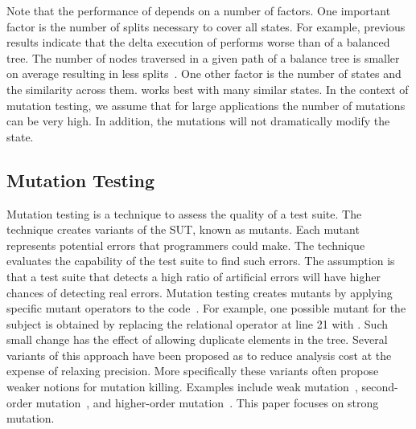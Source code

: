 \documentclass{sig-alternate}
\begin{document}
Note that the performance of \DE{} depends on a number of factors.
One important factor is the number of splits necessary to cover all
states.  For example, previous results indicate that the delta
execution of  performs worse than of a balanced tree.  The
number of nodes traversed in a given path of a balance tree is smaller
on average resulting in less
splits~\cite{damorim:issta2007,dAmorimLM08}.  One other factor is the
number of states and the similarity across them.  \DE{} works best
with many similar states.  In the context of mutation testing, we
assume that for large applications the number of mutations can be very
high.  In addition, the mutations will not dramatically modify the
state.



\subsection{Mutation Testing}
\label{sec:mut}

Mutation testing is a technique to assess the quality of a test suite.
The technique creates variants of the SUT, known as mutants.  Each
mutant represents potential errors that programmers could make.  The
technique evaluates the capability of the test suite to find such
errors.  The assumption is that a test suite that detects a high ratio
of artificial errors will have higher chances of detecting real
errors.  Mutation testing creates mutants by applying specific mutant
operators to the
code~\cite{offut-etal-1994,ma02:interclass,yu-seung-ma-etal-2005}.
For example, one possible mutant for the  subject is
obtained by replacing the relational operator \CodeIn{>} at line 21
with \CodeIn{>=}.  Such small change has the effect of allowing
duplicate elements in the tree.  Several variants of this approach
have been proposed as to reduce analysis cost at the expense of
relaxing precision.  More specifically these variants often propose
weaker notions for mutation killing.  Examples include weak
mutation~\cite{howden82:weak}, second-order
mutation~\cite{macario-etal-2009}, and higher-order
mutation~\cite{jia-harman-2009}.  This paper focuses on strong
mutation.
\end{document}
